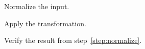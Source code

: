 \documentclass{article}
\begin{document}
\begin{steps}
  \item Normalize the input.\label{step:normalize}
  \item Apply the transformation.
  \item Verify the result from step~\ref{step:normalize}.
\end{steps}
\end{document}
